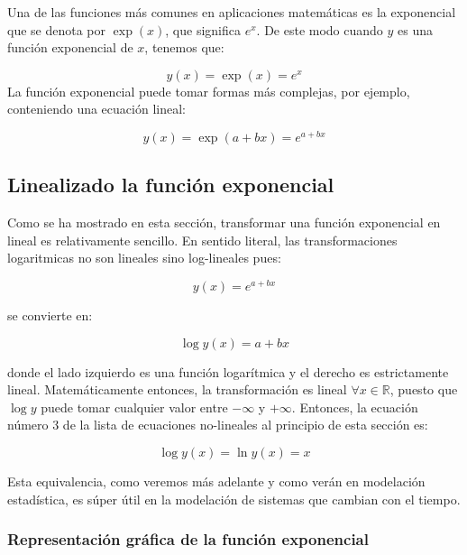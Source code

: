\documentclass[
]{book}
\begin{document}
Una de las funciones más comunes en aplicaciones matemáticas es la exponencial que se denota por \(\exp(x)\), que significa \(e^x\). De este modo cuando \(y\) es una función exponencial de \(x\), tenemos que:

\[y(x) = \exp(x) = e^x\]
La función exponencial puede tomar formas más complejas, por ejemplo, conteniendo una ecuación lineal:

\[y(x) = \exp(a + bx) = e^{a + bx}\]

\hypertarget{linealizado-la-funciuxf3n-exponencial}{%
\subsection{Linealizado la función exponencial}\label{linealizado-la-funciuxf3n-exponencial}}

Como se ha mostrado en esta sección, transformar una función exponencial en lineal es relativamente sencillo. En sentido literal, las transformaciones logaritmicas no son lineales sino log-lineales pues:

\begin{equation}
    y(x) = e^{a + bx} \label{eq:expon}
\end{equation}

se convierte en:

\begin{equation}
    \log y(x) = a + bx \label{eq:log-lin}
\end{equation}

donde el lado izquierdo es una función logarítmica y el derecho es estrictamente lineal. Matemáticamente entonces, la transformación es lineal \(\forall x \in \mathbb{R}\), puesto que \(\log y\) puede tomar cualquier valor entre \(-\infty\) y \(+\infty\). Entonces, la ecuación número 3 de la lista de ecuaciones no-lineales al principio de esta sección es:

\[\log y(x) = \ln y(x) = x\]

Esta equivalencia, como veremos más adelante y como verán en modelación estadística, es súper útil en la modelación de sistemas que cambian con el tiempo.

\hypertarget{representaciuxf3n-gruxe1fica-de-la-funciuxf3n-exponencial}{%
\subsubsection{Representación gráfica de la función exponencial}\label{representaciuxf3n-gruxe1fica-de-la-funciuxf3n-exponencial}}
\end{document}
